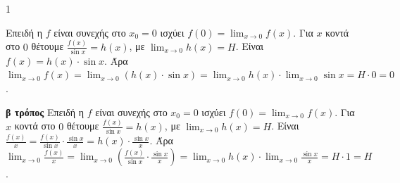 \begin{ylh}{1}
    \item [Συνέχεια συνάρτησης, Παράγωγος συνάρτησης, Εφαπτομένη γραφικής παράστασης]
\end{ylh}
Επειδή η $f$ είναι συνεχής στο $x_0 = 0$ ισχύει $f(0) = \lim_{x \to 0} f(x)$.
Για $x$ κοντά στο $0$ θέτουμε $\frac{f(x)}{\sin x} = h(x)$, με $\lim_{x \to 0} h(x) = H$.
Είναι $f(x) = h(x) \cdot \sin x$.
Άρα $\lim_{x \to 0} f(x) = \lim_{x \to 0} (h(x) \cdot \sin x) = \lim_{x \to 0} h(x) \cdot \lim_{x \to 0} \sin x = H \cdot 0 = 0$.

\textbf{β τρόπος}
Επειδή η $f$ είναι συνεχής στο $x_0 = 0$ ισχύει $f(0) = \lim_{x \to 0} f(x)$.
Για $x$ κοντά στο $0$ θέτουμε $\frac{f(x)}{\sin x} = h(x)$, με $\lim_{x \to 0} h(x) = H$.
Είναι $\frac{f(x)}{x} = \frac{f(x)}{\sin x} \cdot \frac{\sin x}{x} = h(x) \cdot \frac{\sin x}{x}$.
Άρα $\lim_{x \to 0} \frac{f(x)}{x} = \lim_{x \to 0} \left( \frac{f(x)}{\sin x} \cdot \frac{\sin x}{x} \right) = \lim_{x \to 0} h(x) \cdot \lim_{x \to 0} \frac{\sin x}{x} = H \cdot 1 = H$.


